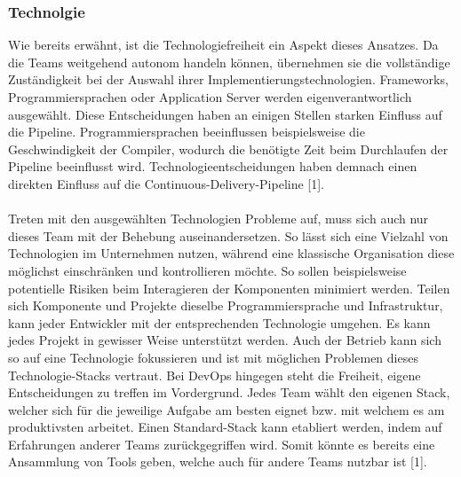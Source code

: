 \subsubsection{Technolgie}
Wie bereits erwähnt, ist die Technologiefreiheit ein Aspekt dieses Ansatzes. Da die Teams weitgehend autonom handeln können, übernehmen sie die vollständige Zuständigkeit bei der Auswahl ihrer Implementierungstechnologien. Frameworks, Programmiersprachen oder Application Server werden eigenverantwortlich ausgewählt. Diese Entscheidungen haben an einigen Stellen starken Einfluss auf die Pipeline. Programmiersprachen beeinflussen beispielsweise die Geschwindigkeit der Compiler, wodurch die benötigte Zeit beim Durchlaufen der Pipeline beeinflusst wird. Technologieentscheidungen haben demnach einen direkten Einfluss auf die Continuous-Delivery-Pipeline [1].\\ \\
Treten mit den ausgewählten Technologien Probleme auf, muss sich auch nur dieses Team mit der Behebung auseinandersetzen. So lässt sich eine Vielzahl von Technologien im Unternehmen nutzen, während eine klassische Organisation diese möglichst einschränken und kontrollieren möchte. So sollen beispielsweise potentielle Risiken beim Interagieren der Komponenten minimiert werden. Teilen sich Komponente und Projekte dieselbe Programmiersprache und Infrastruktur, kann jeder Entwickler mit der entsprechenden Technologie umgehen. Es kann jedes Projekt in gewisser Weise unterstützt werden. Auch der Betrieb kann sich so auf eine Technologie fokussieren und ist mit möglichen Problemen dieses Technologie-Stacks vertraut. Bei DevOps hingegen steht die Freiheit, eigene Entscheidungen zu treffen im Vordergrund. Jedes Team wählt den eigenen Stack, welcher sich für die jeweilige Aufgabe am besten eignet bzw. mit welchem es am produktivsten arbeitet. Einen Standard-Stack kann etabliert werden, indem auf Erfahrungen anderer Teams zurückgegriffen wird. Somit könnte es bereits eine Ansammlung von Tools geben, welche auch für andere Teams nutzbar ist [1]. 

